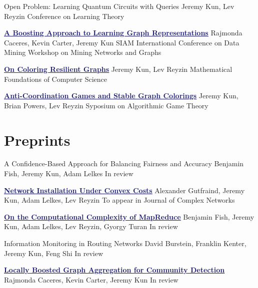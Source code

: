 \documentclass[11pt]{moderncv}
\begin{document}
         {Open Problem: Learning Quantum Circuits with Queries}
      {Jeremy Kun, Lev Reyzin}
      {Conference on Learning Theory}
      {}
      {}

         {\href{http://arxiv.org/abs/1401.3258}{\textcolor{MidnightBlue}{\underline{\textbf{A Boosting Approach to Learning Graph Representations}}}}}
      {Rajmonda Caceres, Kevin Carter, Jeremy Kun}
      {SIAM International Conference on Data Mining Workshop on Mining Networks and Graphs}
      {}
      {}

         {\href{http://arxiv.org/abs/1402.4376}{\textcolor{MidnightBlue}{\underline{\textbf{On Coloring Resilient Graphs}}}}}
      {Jeremy Kun, Lev Reyzin}
      {Mathematical Foundations of Computer Science}
      {}
      {}

         {\href{http://arxiv.org/abs/1308.3258}{\textcolor{MidnightBlue}{\underline{\textbf{Anti-Coordination Games and Stable Graph Colorings}}}}}
      {Jeremy Kun, Brian Powers, Lev Reyzin}
      {Syposium on Algorithmic Game Theory}
      {}
      {}


   \section{Preprints}
         \cventry{}
         {A Confidence-Based Approach for Balancing Fairness and Accuracy}
      {}
      {Benjamin Fish, Jeremy Kun, Adam Lelkes}
      {}
      {In review}

      \cventry{}
         {\href{http://arxiv.org/abs/1411.3640}{\textcolor{MidnightBlue}{\underline{\textbf{Network Installation Under Convex Costs}}}}}
      {}
      {Alexander Gutfraind, Jeremy Kun, Adam Lelkes, Lev Reyzin}
      {}
      {To appear in Journal of Complex Networks}

      \cventry{}
         {\href{http://arxiv.org/abs/1410.0245}{\textcolor{MidnightBlue}{\underline{\textbf{On the Computational Complexity of MapReduce}}}}}
      {}
      {Benjamin Fish, Jeremy Kun, Adam Lelkes, Lev Reyzin, Gyorgy Turan}
      {}
      {In review}

      \cventry{}
         {Information Monitoring in Routing Networks}
      {}
      {David Burstein, Franklin Kenter, Jeremy Kun, Feng Shi}
      {}
      {In review}

      \cventry{}
         {\href{http://arxiv.org/abs/1405.3210}{\textcolor{MidnightBlue}{\underline{\textbf{Locally Boosted Graph Aggregation for Community Detection}}}}}
      {}
      {Rajmonda Caceres, Kevin Carter, Jeremy Kun}
      {}
      {In review}
\end{document}
